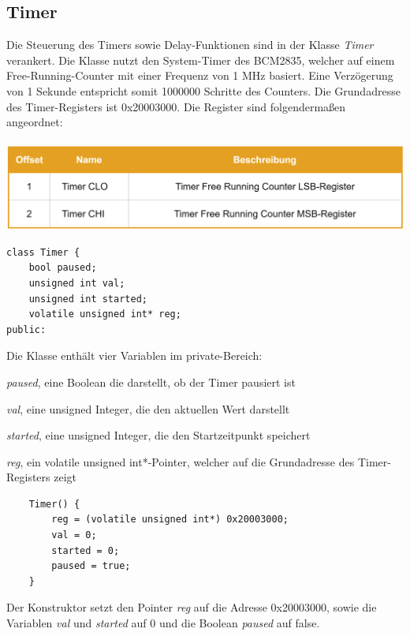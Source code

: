 \documentclass[12pt]{article}
\begin{document}
\subsection{Timer}
Die Steuerung des Timers sowie Delay-Funktionen sind in der Klasse \textit{Timer} verankert. Die Klasse nutzt den System-Timer des BCM2835, welcher auf einem Free-Running-Counter mit einer Frequenz von 1 MHz basiert. Eine Verzögerung von 1 Sekunde entspricht somit 1000000 Schritte des Counters. Die Grundadresse des Timer-Registers ist 0x20003000. Die Register sind folgendermaßen angeordnet:\\\\
\includegraphics[width=\textwidth]{img/timer_table.png}
\begin{center}\end{center}
\begin{verbatim}
class Timer {
    bool paused;
    unsigned int val;
    unsigned int started;
    volatile unsigned int* reg;
public: 
\end{verbatim}
\vspace{-2mm}
Die Klasse enthält vier Variablen im private-Bereich: 
\begin{compactitem}
\item \textit{paused}, eine Boolean die darstellt, ob der Timer pausiert ist
\item \textit{val}, eine unsigned Integer, die den aktuellen Wert darstellt
\item \textit{started}, eine unsigned Integer, die den Startzeitpunkt speichert
\item \textit{reg}, ein volatile unsigned int*-Pointer, welcher auf die Grundadresse des Timer-Registers zeigt
\end{compactitem}
\begin{verbatim}
    Timer() {
        reg = (volatile unsigned int*) 0x20003000;
        val = 0;
        started = 0;
        paused = true;
    }
\end{verbatim} 
\vspace{-2mm}
Der Konstruktor setzt den Pointer \textit{reg} auf die Adresse 0x20003000, sowie die Variablen \textit{val} und \textit{started} auf 0 und die Boolean \textit{paused} auf false.\\\\\\
\end{document}
